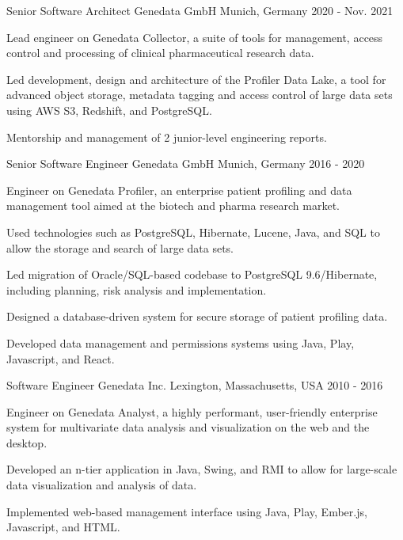 \begin{cventries}
  \cventry
  {Senior Software Architect} %
  {Genedata GmbH} %
  {Munich, Germany} %
  {2020 - Nov. 2021} %
  {
    \begin{cvitems} %
      \item {Lead engineer on Genedata Collector, a suite of tools for management, access control and processing of clinical pharmaceutical research data.}
      \item {Led development, design and architecture of the Profiler Data Lake, a tool for advanced object storage, metadata tagging and access control of large data sets using AWS S3, Redshift, and PostgreSQL.}
      \item {Mentorship and management of 2 junior-level engineering reports.}
    \end{cvitems}
  }

  \cventry
  {Senior Software Engineer} %
  {Genedata GmbH} %
  {Munich, Germany} %
  {2016 - 2020} %
  {
    \begin{cvitems} %
      \item {Engineer on Genedata Profiler, an enterprise patient profiling and data management tool aimed at the biotech and pharma research market.}
      \item {Used technologies such as PostgreSQL, Hibernate, Lucene, Java, and SQL to allow the storage and search of large data sets.}
      \item {Led migration of Oracle/SQL-based codebase to PostgreSQL 9.6/Hibernate, including planning, risk analysis and implementation.}
      \item {Designed a database-driven system for secure storage of patient profiling data.}
      \item {Developed data management and permissions systems using Java, Play, Javascript, and React.}
    \end{cvitems}
  }

\cventry
{Software Engineer} %
{Genedata Inc.} %
{Lexington, Massachusetts, USA} %
{2010 - 2016} %
{
  \begin{cvitems} %
    \item {Engineer on Genedata Analyst, a highly performant, user-friendly enterprise system for multivariate data analysis and visualization on the web and the desktop.}
    \item {Developed an n-tier application in Java, Swing, and RMI to allow for large-scale data visualization and analysis of data.}
    \item {Implemented web-based management interface using Java, Play, Ember.js, Javascript, and HTML.}
  \end{cvitems}
}


\end{cventries}
